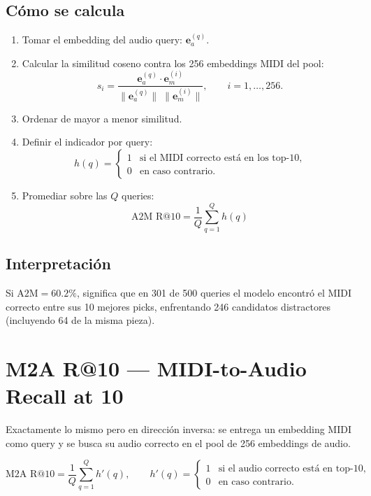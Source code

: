 \documentclass[11pt,a4paper]{article}
\newcommand{\metrica}[1]{\textbf{\textsf{#1}}}
\begin{document}
\subsection*{C\'omo se calcula}

\begin{enumerate}[nosep]
  \item Tomar el embedding del audio query: $\mathbf{e}_a^{(q)}$.
  \item Calcular la similitud coseno contra los 256 embeddings MIDI del pool:
    \[
      s_i = \frac{\mathbf{e}_a^{(q)} \cdot \mathbf{e}_m^{(i)}}
                 {\|\mathbf{e}_a^{(q)}\|\;\|\mathbf{e}_m^{(i)}\|},
      \qquad i = 1, \dots, 256.
    \]
  \item Ordenar de mayor a menor similitud.
  \item Definir el indicador por query:
    \[
      h(q) =
      \begin{cases}
        1 & \text{si el MIDI correcto est\'a en los top-10,} \\
        0 & \text{en caso contrario.}
      \end{cases}
    \]
  \item Promediar sobre las $Q$ queries:
    \[
      \boxed{\;\text{A2M R@10} = \frac{1}{Q}\sum_{q=1}^{Q} h(q)\;}
    \]
\end{enumerate}

\subsection*{Interpretaci\'on}

Si $\text{A2M} = 60.2\%$, significa que en 301 de 500 queries el modelo
encontr\'o el MIDI correcto entre sus 10 mejores picks, enfrentando
246 candidatos distractores (incluyendo 64 de la misma pieza).

\section{\metrica{M2A R@10} --- MIDI-to-Audio Recall at 10}

Exactamente lo mismo pero en direcci\'on inversa: se entrega un embedding MIDI
como query y se busca su audio correcto en el pool de 256 embeddings de audio.

\[
  \text{M2A R@10} = \frac{1}{Q}\sum_{q=1}^{Q} h'(q),
  \qquad
  h'(q) =
  \begin{cases}
    1 & \text{si el audio correcto est\'a en top-10,} \\
    0 & \text{en caso contrario.}
  \end{cases}
\]
\end{document}
